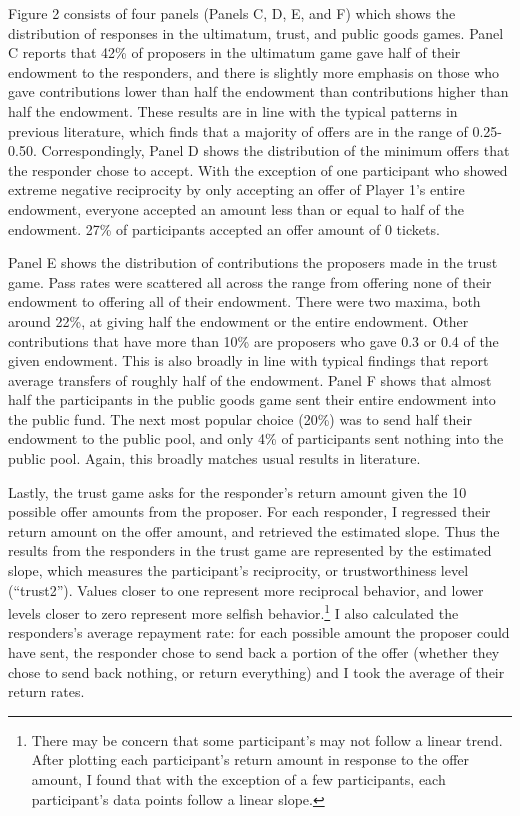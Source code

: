 \documentclass[12pt]{article}
\begin{document}
Figure 2 consists of four panels (Panels C, D, E, and F) which shows the distribution of responses in the ultimatum, trust, and public goods games. Panel C reports that 42\% of proposers in the ultimatum game gave half of their endowment to the responders, and there is slightly more emphasis on those who gave contributions lower than half the endowment than contributions higher than half the endowment. These results are in line with the typical patterns in previous literature, which finds that a majority of offers are in the range of 0.25-0.50. Correspondingly, Panel D shows the distribution of the minimum offers that the responder chose to accept. With the exception of one participant who showed extreme negative reciprocity by only accepting an offer of Player 1's entire endowment, everyone accepted an amount less than or equal to half of the endowment. 27\% of participants accepted an offer amount of 0 tickets. 

Panel E shows the distribution of contributions the proposers made in the trust game. Pass rates were scattered all across the range from offering none of their endowment to offering all of their endowment. There were two maxima, both around 22\%, at giving half the endowment or the entire endowment. Other contributions that have more than 10\% are proposers who gave 0.3 or 0.4 of the given endowment. This is also broadly in line with typical findings that report average transfers of roughly half of the endowment. Panel F shows that almost half the participants in the public goods game sent their entire endowment into the public fund. The next most popular choice (20\%) was to send half their endowment to the public pool, and only 4\% of participants sent nothing into the public pool. Again, this broadly matches usual results in literature.

Lastly, the trust game asks for the responder\rq s return amount given the 10 possible offer amounts from the proposer. For each responder, I regressed their return amount on the offer amount, and retrieved the estimated slope. Thus the results from the responders in the trust game are represented by the estimated slope, which measures the participant\rq s reciprocity, or trustworthiness level (``trust2''). Values closer to one represent more reciprocal behavior, and lower levels closer to zero represent more selfish behavior.\footnote{There may be concern that some participant\rq s may not follow a linear trend. After plotting each participant\rq s return amount in response to the offer amount, I found that with the exception of a few participants, each participant\rq s data points follow a linear slope.} I also calculated the responders\rq s average repayment rate: for each possible amount the proposer could have sent, the responder chose to send back a portion of the offer (whether they chose to send back nothing, or return everything) and I took the average of their return rates.
\end{document}
